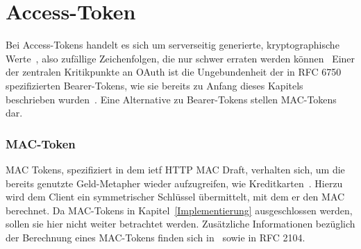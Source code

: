 \section{Access-Token}\label{accessTokens}
Bei Access-Tokens handelt es sich um serverseitig generierte, kryptographische
Werte~, also zufällige Zeichenfolgen, die nur schwer
erraten werden können~ Einer der zentralen
Kritikpunkte an \gls{OAuth} ist die Ungebundenheit der in RFC 6750
spezifizierten Bearer-Tokens, wie sie bereits zu Anfang dieses Kapitels
beschrieben wurden~. Eine Alternative zu Bearer-Tokens
stellen MAC-Tokens dar.

\subsubsection{MAC-Token}\label{ssec: MAC Token}
MAC Tokens, spezifiziert in dem \gls{ietf} HTTP MAC Draft, verhalten sich, um
die bereits genutzte Geld-Metapher wieder aufzugreifen, wie
Kreditkarten~. Hierzu wird dem Client ein
symmetrischer Schlüssel übermittelt, mit dem er den MAC berechnet. Da MAC-Tokens
in Kapitel~\ref{Implementierung} ausgeschlossen werden, sollen sie hier nicht
weiter betrachtet werden. Zusätzliche Informationen bezüglich der Berechnung
eines MAC-Tokens finden sich in~\cite[S.~136ff.]{Siriwardena.2014} sowie in
RFC 2104.

